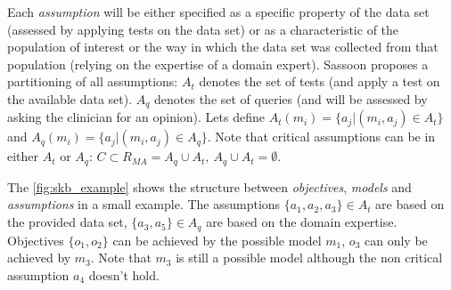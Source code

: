 Each \textit{assumption} will be either specified as a specific property of the data set (assessed by applying tests on the data set) or as a characteristic of the population of interest or the way in which the data set was collected from that population (relying on the expertise of a domain expert). Sassoon proposes a partitioning of all assumptions: $A_t$ denotes the set of tests (and apply a test on the available data set). $A_q$ denotes the set of queries (and will be assessed by asking the clinician for an opinion). Lets define $A_t(m_i)= \{a_j| (m_i, a_j) \in A_t\}$ and $A_q(m_i)= \{a_j| (m_i, a_j) \in A_q\}$. Note that critical assumptions can be in either $A_t$ or $A_q$: $C \subset R_{MA} = A_q \cup A_t, ~A_q \cup A_t = \emptyset$. 

The \autoref{fig:skb_example} shows the structure between \textit{objectives}, \textit{models} and \textit{assumptions} in a small example. The assumptions $\{a_1, a_2, a_3\} \in A_t$ are based on the provided data set, $\{a_3, a_5\} \in A_q$ are based on the domain expertise. Objectives $\{o_1, o_2\}$ can  be achieved by the possible model $m_1$, $o_3$ can only be achieved by $m_3$. Note that $m_3$ is still a possible model although the non critical assumption $a_4$ doesn't hold.

